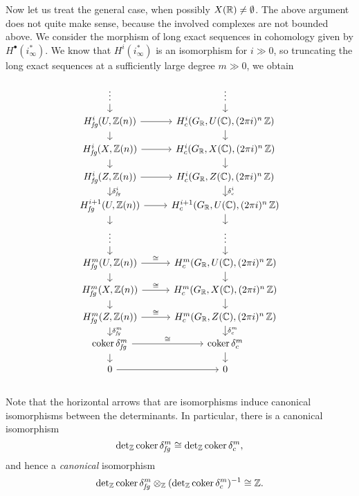 \begin{nameless}
  Now let us treat the general case, when possibly $X (\mathbb{R}) \ne \emptyset$.
  The above argument does not quite make sense, because the involved complexes
  are not bounded above. We consider the morphism of long exact sequences in
  cohomology given by $H^\bullet (i_\infty^*)$. We know that $H^i (i_\infty^*)$
  is an isomorphism for $i \gg 0$, so truncating the long exact sequences at a
  sufficiently large degree $m \gg 0$, we obtain

  \begin{equation}
    \label{eqn:les-truncation-RGammafg-RGammac}
    \begin{tikzcd}[row sep=small]
      \vdots\ar{d} & \vdots\ar{d} \\
      H_\text{\it fg}^i (U, \ZZ (n)) \ar{r}\ar{d} & H^i_c (G_\RR, U (\CC), (2\pi i)^n\,\ZZ)\ar{d} \\
      H_\text{\it fg}^i (X, \ZZ (n)) \ar{r}\ar{d} & H^i_c (G_\RR, X (\CC), (2\pi i)^n\,\ZZ)\ar{d} \\
      H_\text{\it fg}^i (Z, \ZZ (n)) \ar{r}\ar{d}{\delta_\text{\it fg}^i} & H^i_c (G_\RR, Z (\CC), (2\pi i)^n\,\ZZ)\ar{d}{\delta_c^i} \\
      H_\text{\it fg}^{i+1} (U, \ZZ (n)) \ar{r}\ar{d} & H^{i+1}_c (G_\RR, U (\CC), (2\pi i)^n\,\ZZ)\ar{d} \\
      \vdots\ar{d} & \vdots\ar{d} \\
      H_\text{\it fg}^m (U, \ZZ (n)) \ar{r}{\isom}\ar{d} & H^m_c (G_\RR, U (\CC), (2\pi i)^n\,\ZZ)\ar{d} \\
      H_\text{\it fg}^m (X, \ZZ (n)) \ar{r}{\isom}\ar{d} & H^m_c (G_\RR, X (\CC), (2\pi i)^n\,\ZZ)\ar{d} \\
      H_\text{\it fg}^m (Z, \ZZ (n)) \ar{r}{\isom}\ar{d}{\delta_\text{\it fg}^m} & H^m_c (G_\RR, Z (\CC), (2\pi i)^n\,\ZZ)\ar{d}{\delta_c^m} \\
      \coker \delta_\text{\it fg}^m \ar{r}{\isom}\ar{d} & \coker \delta_c^m\ar{d} \\
      0 \ar{r} & 0 \\
    \end{tikzcd}
  \end{equation}

  Note that the horizontal arrows that are isomorphisms induce canonical
  isomorphisms between the determinants. In particular, there is a canonical
  isomorphism
  \[ \det\nolimits_{\mathbb{Z}} \operatorname{coker} \delta_\text{\it fg}^m \cong
    \det\nolimits_{\mathbb{Z}} \operatorname{coker} \delta_c^m, \]
  and hence a \emph{canonical} isomorphism
  \begin{equation}
    \label{eqn:les-truncation-canonical-cancelation-of-cokernels}
    \det\nolimits_{\mathbb{Z}} \operatorname{coker} \delta_\text{\it fg}^m
    \otimes_{\mathbb{Z}}
    (\det\nolimits_{\mathbb{Z}} \operatorname{coker} \delta_c^m)^{-1} \cong \mathbb{Z}.
  \end{equation}


\end{nameless}
